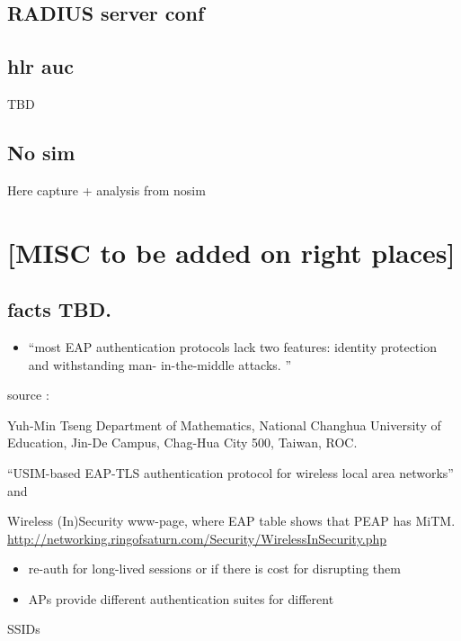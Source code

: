 \documentclass[12pt,a4paper,english]{tutthesis}
\begin{document}
\begin{otherlanguage}{english}
\section{RADIUS server conf}
\label{sec-7-3}
\label{app:radius-conf}
\scriptsize

\normalsize
\section{hlr auc}
\label{sec-7-4}

\label{app:hlraucgw}
\scriptsize

\normalsize
TBD
\scriptsize

\section{No sim}
\label{sec-7-5}
\label{app:nosim}

Here capture + analysis from nosim


\end{otherlanguage} %
\chapter{[MISC to be added on right places]}
\label{sec-8}
\section{facts TBD.}
\label{sec-8-1}
\begin{itemize}
\item ``most EAP authentication protocols lack two features: identity
protection and withstanding man- in-the-middle attacks. ''
\end{itemize}
source :

Yuh-Min Tseng Department of Mathematics, National Changhua University of Education,
Jin-De Campus, Chag-Hua City 500, Taiwan, ROC.

``USIM-based EAP-TLS authentication protocol for
wireless local area networks''
and 

Wireless (In)Security www-page, where 
EAP table shows that PEAP has MiTM.
\url{http://networking.ringofsaturn.com/Security/WirelessInSecurity.php}

\begin{itemize}
\item re-auth for long-lived sessions or if there is cost for disrupting them
\item APs provide different authentication suites for different
\end{itemize}
SSIDs 
\end{document}
